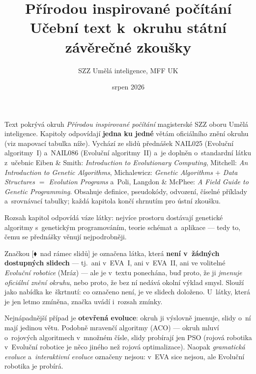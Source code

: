\documentclass[11pt,a4paper]{article}
\title{\textbf{Přírodou inspirované počítání}\\[2mm]
\large Učební text k~okruhu státní závěrečné zkoušky}
\author{SZZ Umělá inteligence, MFF UK}
\date{srpen 2026}
\theoremstyle{definition}
\newcommand{\mimo}{\textcolor{markcol}{\textsf{\footnotesize[$\blacklozenge$~nad rámec slidů]}}}
\begin{document}
\maketitle

\begin{center}
\begin{minipage}{0.92\textwidth}
\small
Text pokrývá okruh \emph{Přírodou inspirované počítání} magisterské SZZ oboru Umělá
inteligence. Kapitoly odpovídají \textbf{jedna ku jedné} větám oficiálního znění okruhu
(viz mapovací tabulka níže). Vychází ze slidů přednášek NAIL025 (Evoluční algoritmy~I)
a~NAIL086 (Evoluční algoritmy~II) a~je doplněn o~standardní látku z~učebnic
Eiben \& Smith: \emph{Introduction to Evolutionary Computing}, Mitchell:
\emph{An Introduction to Genetic Algorithms}, Michalewicz: \emph{Genetic Algorithms $+$
Data Structures $=$ Evolution Programs} a~Poli, Langdon \& McPhee: \emph{A Field Guide to
Genetic Programming}. Obsahuje definice, pseudokódy, odvození, číselné příklady
a~srovnávací tabulky; každá kapitola končí shrnutím pro ústní zkoušku.
\end{minipage}
\end{center}

\begin{center}
\begin{minipage}{0.92\textwidth}
\begin{poznbox}
\small
Rozsah kapitol odpovídá váze látky: nejvíce prostoru dostávají genetické algoritmy
s~genetickým programováním, teorie schémat a~aplikace --- tedy to, čemu se přednášky
věnují nejpodrobněji.

Značkou \mimo{} je označena látka, která \textbf{není v~žádných dostupných slidech} ---
tj.\ ani v~EVA~I, ani v~EVA~II, ani ve volitelné \emph{Evoluční robotice} (Mráz) --- ale je
v~textu ponechána, buď proto, že ji \emph{jmenuje oficiální znění okruhu}, nebo proto, že
bez ní nedává okolní výklad smysl. Slouží jako nabídka ke~škrtnutí: co označeno není, je ve
slidech doloženo. U~látky, která je jen letmo zmíněna, značka uvádí i~rozsah zmínky.

Nejnápadnější případ je \textbf{otevřená evoluce}: okruh ji výslovně jmenuje, slidy o~ní
mají jedinou větu. Podobně mravenčí algoritmy (ACO) --- okruh mluví o~rojových algoritmech
v~množném čísle, slidy probírají jen PSO (rojová robotika v~Evoluční robotice je něco
jiného než rojová optimalizace). Naopak \emph{gramatická evoluce} a~\emph{interaktivní
evoluce} označeny nejsou: v~EVA sice nejsou, ale Evoluční robotika je probírá.
\end{poznbox}
\end{minipage}
\end{center}
\end{document}
